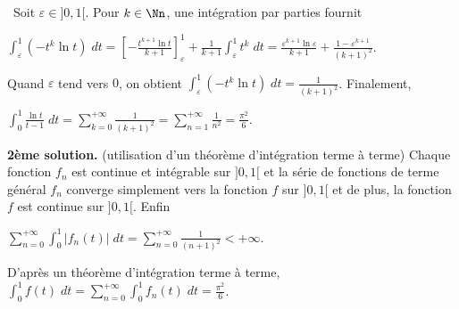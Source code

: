 {{\textbullet~Soit $\varepsilon\in]0,1[$. Pour $k\in\Nn$, une intégration par parties fournit

\begin{center}
$\int_{\varepsilon}^{1}(-t^k\ln t)\;dt=\left[-\frac{t^{k+1}\ln t}{k+1}\right]_\varepsilon^{1}+\frac{1}{k+1}\int_{\varepsilon}^{1}t^k\;dt=\frac{\varepsilon^{k+1}\ln \varepsilon}{k+1}+\frac{1-\varepsilon^{k+1}}{(k+1)^2}$.
\end{center}

Quand $\varepsilon$ tend vers $0$, on obtient $\int_{\varepsilon}^{1}(-t^k\ln t)\;dt=\frac{1}{(k+1)^2}$. Finalement,

\begin{center}
$\int_{0}^{1}\frac{\ln t}{t-1}\;dt=\sum_{k=0}^{+\infty}\frac{1}{(k+1)^2}=\sum_{n=1}^{+\infty}\frac{1}{n^2}=\frac{\pi^2}{6}$.
\end{center}

\begin{center}
\end{center}

\textbf{2ème solution.} (utilisation d'un théorème d'intégration terme à terme) Chaque fonction $f_n$ est continue et intégrable sur $]0,1[$ et la série de fonctions de terme général $f_n$ converge simplement vers la fonction $f$ sur $]0,1[$ et de plus, la fonction $f$ est continue sur $]0,1[$. Enfin

\begin{center}
$\sum_{n=0}^{+\infty}\int_{0}^{1}|f_n(t)|\;dt=\sum_{n=0}^{+\infty}\frac{1}{(n+1)^2}<+\infty$.
\end{center}

D'après un théorème d'intégration terme à terme, $\int_{0}^{1}f(t)\;dt=\sum_{n=0}^{+\infty}\int_{0}^{1}f_n(t)\;dt=\frac{\pi^2}{6}$.
}
}
